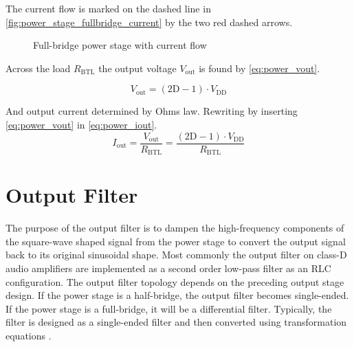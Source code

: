 The current flow is marked on the dashed line in \autoref{fig:power_stage_fullbridge_current} by the two red dashed arrows. \\

\begin{figure}[htbp]
	\centering
	\begin{circuitikz}
		
	\end{circuitikz}
	\caption{Full-bridge power stage with current flow}
	\label{fig:power_stage_fullbridge_current}
\end{figure}

Across the load $R_{\mathrm{BTL}}$ the output voltage $V_{\mathrm{out}}$ is found by \autoref{eq:power_vout}.

\begin{equation} \label{eq:power_vout}
	V_{\mathrm{out}} = \left( 2\mathrm{D} - 1 \right) \cdot V_{\mathrm{DD}}
\end{equation}

And output current determined by Ohms law. Rewriting by inserting \autoref{eq:power_vout} in \autoref{eq:power_iout}.
\begin{equation} \label{eq:power_iout}
	I_{\mathrm{out}} = \frac{V_{\mathrm{out}}}{R_{\mathrm{BTL}}} = \frac{\left( 2\mathrm{D} - 1 \right) \cdot V_{\mathrm{DD}}}{R_{\mathrm{BTL}}}
\end{equation}



\section{Output Filter}

The purpose of the output filter is to dampen the high-frequency components of the square-wave shaped signal from the power stage to convert the output signal back to its original sinusoidal shape. Most commonly the output filter on class-D audio amplifiers are implemented as a second order low-pass filter as an RLC configuration. The output filter topology depends on the preceding output stage design. If the power stage is a half-bridge, the output filter becomes single-ended. If the power stage is a full-bridge, it will be a differential filter. Typically, the filter is designed as a single-ended filter and then converted using transformation equations \cite{multivar_ctrl_loops_for_SM_audio_systems}.

